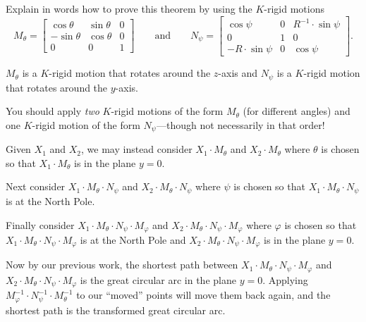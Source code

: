 \documentclass{ximera}
\begin{document}
\begin{problem}
  Explain in words how to prove this theorem by using the $K$-rigid
  motions
  \[
  M_\theta=
  \begin{bmatrix}
    \cos\theta & \sin\theta & 0\\
    -\sin\theta & \cos\theta & 0\\
    0 & 0 & 1
  \end{bmatrix}
  \qquad\text{and}\qquad
  N_\psi=
  \begin{bmatrix}
    \cos\psi & 0 & R^{-1}\cdot\sin\psi\\
    0 & 1 & 0\\
    -R\cdot\sin\psi & 0 & \cos\psi
  \end{bmatrix}.
  \]
  \begin{hint}
    $M_\theta$ is a $K$-rigid motion that rotates around the $z$-axis and
    $N_\psi$ is a $K$-rigid motion that rotates around the $y$-axis.
  \end{hint}
  \begin{hint}
    You should apply \textit{two} $K$-rigid motions of the form
    $M_\theta$ (for different angles) and one $K$-rigid motion of the
    form $N_\psi$---though not necessarily in that order!
  \end{hint}
  \begin{freeResponse}
    Given $X_1$ and $X_2$, we may instead consider $X_1\cdot M_\theta$
    and $X_2\cdot M_\theta$ where $\theta$ is chosen so that $X_1\cdot
    M_\theta$ is in the plane $y=0$.

    Next consider $X_1\cdot M_\theta\cdot N_\psi$ and $X_2\cdot
    M_\theta\cdot N_\psi$ where $\psi$ is chosen so that $X_1\cdot
    M_\theta\cdot N_\psi$ is at the North Pole.

    Finally consider $X_1\cdot M_\theta\cdot N_\psi\cdot M_\varphi$
    and $X_2\cdot M_\theta\cdot N_\psi\cdot M_\varphi$ where $\varphi$
    is chosen so that $X_1\cdot M_\theta\cdot N_\psi\cdot M_\varphi$
    is at the North Pole and $X_2\cdot M_\theta\cdot N_\psi\cdot
    M_\varphi$ is in the plane $y=0$.

    Now by our previous work, the shortest path between $X_1\cdot
    M_\theta\cdot N_\psi\cdot M_\varphi$ and $X_2\cdot M_\theta\cdot
    N_\psi\cdot M_\varphi$ is the great circular arc in the plane
    $y=0$. Applying $M_\varphi^{-1}\cdot N_\psi^{-1}\cdot
    M_\theta^{-1}$ to our ``moved'' points will move them back again,
    and the shortest path is the transformed great circular arc.
  \end{freeResponse}
\end{problem}
\end{document}
